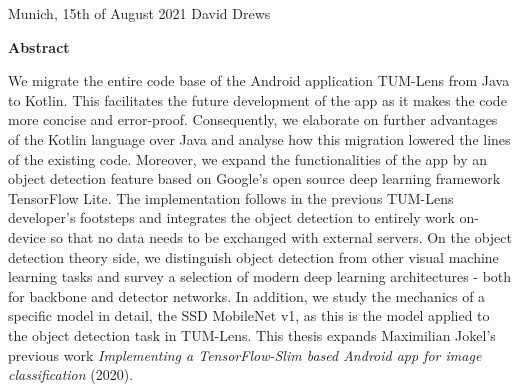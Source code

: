 \documentclass[
			   fontsize=11pt,
               paper=a4,
               bibliography=totoc,
               idxtotoc,
               headsepline,
               footsepline,
               footinclude=false,
               BCOR=12mm,
               DIV=13,
               openany,   %
               ]
               {scrbook}
\def\author{David Drews}
\def\date{15th of August 2021}
\begin{document}
\vspace{15mm}
\noindent
Munich, \date \hspace{5cm} \author
\cleardoubleemptypage


{}
\vspace*{2cm}
\begin{center}
    {\Large \textbf {Abstract}}
\end{center}
\vspace{1cm}

We migrate the entire code base of the Android application TUM-Lens from Java to Kotlin. This facilitates the future development of the app as it makes the code more concise and error-proof. Consequently, we elaborate on further advantages of the Kotlin language over Java and analyse how this migration lowered the lines of the existing code. Moreover, we expand the functionalities of the app by an object detection feature based on Google's open source deep learning framework TensorFlow Lite. The implementation follows in the previous TUM-Lens developer's footsteps and integrates the object detection to entirely work on-device so that no data needs to be exchanged with external servers. On the object detection theory side, we distinguish object detection from other visual machine learning tasks and survey a selection of modern deep learning architectures - both for backbone and detector networks. In addition, we study the mechanics of a specific model in detail, the SSD MobileNet v1, as this is the model applied to the object detection task in TUM-Lens. This thesis expands Maximilian Jokel's previous work \textit{Implementing a TensorFlow-Slim based Android app for image classification} (2020).

\cleardoublepage


\tableofcontents
\thispagestyle{empty}
\cleardoubleemptypage

\end{document}
